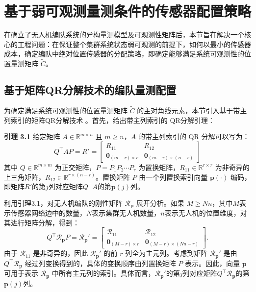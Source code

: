 \section{基于弱可观测量测条件的传感器配置策略}

在确立了无人机编队系统的异构量测模型及可观测性矩阵后，本节旨在解决一个核心的工程问题：在保证整个集群系统状态弱可观测的前提下，如何以最小的传感器成本，确定编队中绝对位置传感器的分配策略，即确定能够满足系统可观测性的位置量测矩阵 $\tilde{C}$。

\subsection{基于矩阵QR分解技术的编队量测配置}
为确定满足系统可观测性的位置量测矩阵 $\tilde{C}$ 的主对角线元素，本节引入基于带主列索引的矩阵QR分解技术 。首先，给出带主列索引的 QR分解引理：

\textbf{引理 3.1} 给定矩阵 $A\in\mathbb{R}^{m\times n}$ 且 $m\ge n$，$A$ 的带主列索引的 QR 分解可以写为：
\begin{equation}
	Q^{\top}AP=R'=
	\begin{bmatrix}
		R_{11} & R_{12}\\
		\mathbf{0}_{(m-r)\times r} & \mathbf{0}_{(m-r)\times (n-r)}
	\end{bmatrix}
\end{equation}
其中 $Q \in \mathbb{R}^{m\times m}$ 为正交矩阵，$P=P_{1} P_{2}\cdots P_{r}$ 为置换矩阵，$R_{11}\in\mathbb{R}^{r\times r}$ 为非奇异的上三角矩阵，$R_{12}\in\mathbb{R}^{r\times (n-r)}$。置换矩阵 $P$ 由一个列置换索引向量 $\mathbf{p}(\cdot)$ 编码，即矩阵$ R' $的第$j$列对应矩阵$Q^{\top}A $的第$\mathbf{p}(j)$列。

利用引理3.1，对无人机编队的刚性矩阵 $\mathcal{R}_{\mathbf{p}}$ 展开分析。如果 $M \ge Nn$，其中$M$表示传感器网络边中的数量，$N$表示集群无人机数量，$n$表示无人机的位置维度，对其进行矩阵分解，得到：
\begin{equation}
	Q^{\top} \mathcal{R}_{\mathbf{p}} P 
	= \mathcal{R}_{\mathbf{p}}' 
	= 
	\begin{bmatrix}
		\mathcal{R}_{11} & \mathcal{R}_{12}\\
		\mathbf{0}_{(M-r) \times r} & \mathbf{0}_{(M-r) \times (Nn-r)}
	\end{bmatrix}.
	\label{刚性矩阵的分解式}
\end{equation} 
由于 $\mathcal{R}_{11}$ 是非奇异的，因此 $\mathcal{R}_{\mathbf{p}}'$ 的前 $r$ 列全为主元列。考虑到矩阵 $\mathcal{R}_{\mathbf{p}}'$ 是由 
$Q^{\top} \mathcal{R}_{\mathbf{p}}$ 经过列变换得到的，具体的变换顺序由列置换矩阵 $P$ 表示。因此，向量 $\mathbf{p}$ 可用于表示 $\mathcal{R}_{\mathbf{p}}$ 中所有主元列的索引。具体而言，$ \mathcal{R}_{\mathbf{p}}' $的第$j$列对应矩阵$Q^{\top} \mathcal{R}_{\mathbf{p}} $的第$\mathbf{p}(j)$列。

